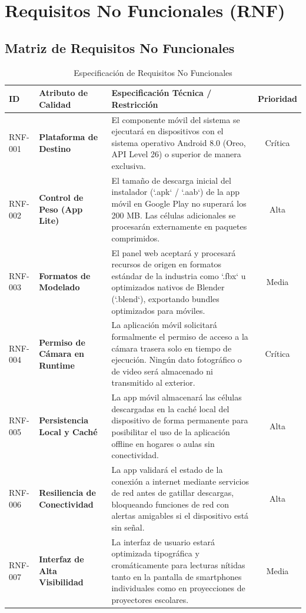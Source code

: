 \documentclass[11pt,a4paper]{article}
\begin{document}
\section{Requisitos No Funcionales (RNF)}
\subsection{Matriz de Requisitos No Funcionales}

\begin{table}[H]
    \centering
    \small
    \caption{Especificación de Requisitos No Funcionales}
    \vspace{2mm}
    \renewcommand{\arraystretch}{1.3}
    \begin{tabularx}{\textwidth}{l >{\bfseries}l X c}
        \rowcolor{primaryDark}
        \color{white}\textbf{ID} & \color{white}\textbf{Atributo de Calidad} & \color{white}\textbf{Especificación Técnica / Restricción} & \color{white}\textbf{Prioridad} \\ \toprule
        RNF-001 & Plataforma de Destino & El componente móvil del sistema se ejecutará en dispositivos con el sistema operativo Android 8.0 (Oreo, API Level 26) o superior de manera exclusiva. & Crítica \\
        RNF-002 & Control de Peso (App Lite) & El tamaño de descarga inicial del instalador (`.apk` / `.aab`) de la app móvil en Google Play no superará los 200 MB. Las células adicionales se procesarán externamente en paquetes comprimidos. & Alta \\
        RNF-003 & Formatos de Modelado & El panel web aceptará y procesará recursos de origen en formatos estándar de la industria como `.fbx` u optimizados nativos de Blender (`.blend`), exportando bundles optimizados para móviles. & Media \\
        RNF-004 & Permiso de Cámara en Runtime & La aplicación móvil solicitará formalmente el permiso de acceso a la cámara trasera solo en tiempo de ejecución. Ningún dato fotográfico o de video será almacenado ni transmitido al exterior. & Crítica \\
        RNF-005 & Persistencia Local y Caché & La app móvil almacenará las células descargadas en la caché local del dispositivo de forma permanente para posibilitar el uso de la aplicación offline en hogares o aulas sin conectividad. & Alta \\
        RNF-006 & Resiliencia de Conectividad & La app validará el estado de la conexión a internet mediante servicios de red antes de gatillar descargas, bloqueando funciones de red con alertas amigables si el dispositivo está sin señal. & Alta \\
        RNF-007 & Interfaz de Alta Visibilidad & La interfaz de usuario estará optimizada tipográfica y cromáticamente para lecturas nítidas tanto en la pantalla de smartphones individuales como en proyecciones de proyectores escolares. & Media \\ \bottomrule
    \end{tabularx}
\end{table}
\end{document}
